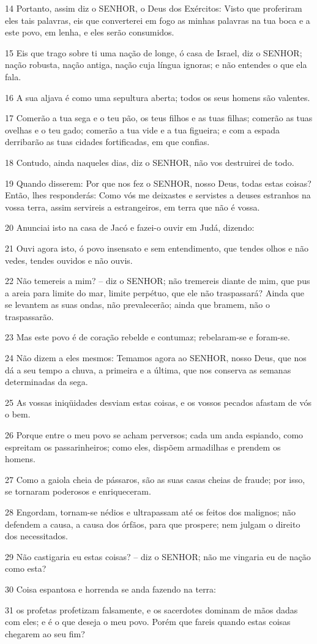 \par 14 Portanto, assim diz o SENHOR, o Deus dos Exércitos: Visto que proferiram eles tais palavras, eis que converterei em fogo as minhas palavras na tua boca e a este povo, em lenha, e eles serão consumidos.
\par 15 Eis que trago sobre ti uma nação de longe, ó casa de Israel, diz o SENHOR; nação robusta, nação antiga, nação cuja língua ignoras; e não entendes o que ela fala.
\par 16 A sua aljava é como uma sepultura aberta; todos os seus homens são valentes.
\par 17 Comerão a tua sega e o teu pão, os teus filhos e as tuas filhas; comerão as tuas ovelhas e o teu gado; comerão a tua vide e a tua figueira; e com a espada derribarão as tuas cidades fortificadas, em que confias.
\par 18 Contudo, ainda naqueles dias, diz o SENHOR, não vos destruirei de todo.
\par 19 Quando disserem: Por que nos fez o SENHOR, nosso Deus, todas estas coisas? Então, lhes responderás: Como vós me deixastes e servistes a deuses estranhos na vossa terra, assim servireis a estrangeiros, em terra que não é vossa.
\par 20 Anunciai isto na casa de Jacó e fazei-o ouvir em Judá, dizendo:
\par 21 Ouvi agora isto, ó povo insensato e sem entendimento, que tendes olhos e não vedes, tendes ouvidos e não ouvis.
\par 22 Não temereis a mim? -- diz o SENHOR; não tremereis diante de mim, que pus a areia para limite do mar, limite perpétuo, que ele não traspassará? Ainda que se levantem as suas ondas, não prevalecerão; ainda que bramem, não o traspassarão.
\par 23 Mas este povo é de coração rebelde e contumaz; rebelaram-se e foram-se.
\par 24 Não dizem a eles mesmos: Temamos agora ao SENHOR, nosso Deus, que nos dá a seu tempo a chuva, a primeira e a última, que nos conserva as semanas determinadas da sega.
\par 25 As vossas iniqüidades desviam estas coisas, e os vossos pecados afastam de vós o bem.
\par 26 Porque entre o meu povo se acham perversos; cada um anda espiando, como espreitam os passarinheiros; como eles, dispõem armadilhas e prendem os homens.
\par 27 Como a gaiola cheia de pássaros, são as suas casas cheias de fraude; por isso, se tornaram poderosos e enriqueceram.
\par 28 Engordam, tornam-se nédios e ultrapassam até os feitos dos malignos; não defendem a causa, a causa dos órfãos, para que prospere; nem julgam o direito dos necessitados.
\par 29 Não castigaria eu estas coisas? -- diz o SENHOR; não me vingaria eu de nação como esta?
\par 30 Coisa espantosa e horrenda se anda fazendo na terra:
\par 31 os profetas profetizam falsamente, e os sacerdotes dominam de mãos dadas com eles; e é o que deseja o meu povo. Porém que fareis quando estas coisas chegarem ao seu fim?

